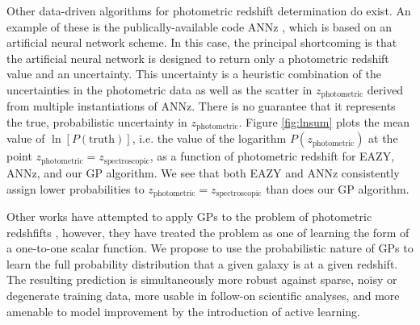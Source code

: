 \documentclass[prd,nofootbib,floatfix,11pt,tightenlines]{revtex4}
\begin{document}
Other data-driven algorithms for photometric redshift determination do exist. 
An example of these is the publically-available code ANNz \cite{annz},
which is based on an artificial neural network scheme.
In this case, the principal
shortcoming  is that the artificial neural network
is designed to return only a
photometric redshift value and an uncertainty.
This uncertainty is a heuristic combination of the uncertainties in the
photometric data as well as the scatter in $z_\text{photometric}$ derived
from multiple instantiations of ANNz.  There is no guarantee that it represents
the true, probabilistic uncertainty in $z_\text{photometric}$.
Figure \ref{fig:lnsum} plots the mean value of $\ln[P(\text{truth})]$,
i.e. the value of the logarithm $P(z_\text{photometric})$ at the point
$z_\text{photometric}=z_\text{spectroscopic}$, 
as a function
of photometric redshift for EAZY, ANNz, and our GP algorithm.
We see that both EAZY and ANNz consistently assign lower probabilities to
$z_\text{photometric}=z_\text{spectroscopic}$ than does our GP algorithm.

Other works have attempted to apply GPs to the problem of
photometric redshfifts \cite{kaufman,bonfield}, however, they have treated
the problem as one of learning the form of a one-to-one scalar function.
We propose to use the probabilistic nature of GPs to learn the full
probability distribution that a given galaxy is at a given redshift.  The
resulting prediction is simultaneously more robust against sparse, noisy or
degenerate training data, more usable in follow-on scientific analyses, and
more amenable to model improvement by the introduction of active learning.
\end{document}
